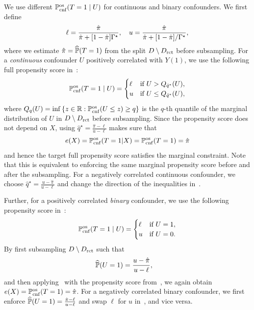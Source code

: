 We use different $\mathbb{P}_{\operatorname{cnf}}^{\operatorname{os}}(T = 1\mid U)$ for continuous and binary confounders.
We first define
\begin{equation}
\label{eq:uplow}
\ell = \frac{\hat{\pi}}{\hat{\pi} + [1-\hat{\pi}]\Gamma^{\star}}, \quad
u = \frac{\hat{\pi}}{\hat{\pi} + [1-\hat{\pi}]/\Gamma^{\star}},
\end{equation}
where we estimate $\hat{\pi} = \widehat{\mathbb{P}}(T = 1)$ from the split $D \setminus D_{\operatorname{rct}}$ before subsampling.
For a \emph{continuous} confounder $U$ positively correlated with $Y(1)$, we use the following full propensity score in~:
\begin{equation}
\label{adv_semi}
\mathbb{P}_{\operatorname{cnf}}^{\operatorname{os}}(T=1 \mid U) = 
\begin{cases}
    \ell & \text{if } U > Q_{\hat{q}^*}(U), \\
    u & \text{if } U \leq Q_{\hat{q}^*}(U),
\end{cases}
\end{equation}
where $Q_q(U) = \inf \left\{ z \in \mathbb{R} : {\mathbb{P}_{\operatorname{cnf}}^{\operatorname{os}}(U \leq z)} \geq q \right\}$ is the $q$-th quantile of the marginal distribution of $U$ in $D \setminus D_{\operatorname{rct}}$ before subsampling.
Since the propensity score does not depend on $X$, using $\hat{q}^\star = \frac{\hat{\pi} - \ell}{u - \ell}$ makes sure that 
$$e(X)=\mathbb{P}_{\operatorname{cnf}}^{\operatorname{os}}(T = 1|X)=\mathbb{P}_{\operatorname{cnf}}^{\operatorname{os}}(T = 1) = \hat \pi$$
and hence the target full propensity score satisfies the marginal constraint. 
Note that this is equivalent to enforcing the same marginal propensity score before and after the subsampling. 
For a negatively correlated continuous confounder, we choose $\hat{q}^\star = \frac{u - \hat{\pi}}{u - \ell}$ and change the direction of the inequalities in~.

Further, for a positively correlated \emph{binary} confounder, we use the following propensity score in~:
\begin{equation}
\label{adv_semi_binary}
\mathbb{P}_{\operatorname{cnf}}^{\operatorname{os}}(T=1 \mid U) = 
\begin{cases}
    \ell & \text{if } U = 1, \\
    u & \text{if } U = 0.
\end{cases}
\end{equation}
By first subsampling $D \setminus D_{\operatorname{rct}}$ such that
\begin{align*}
\widehat{\mathbb{P}}(U = 1) &= \frac{u - \hat{\pi}}{u - \ell},
\end{align*}
and then applying~ with the propensity score from~, we again obtain $e(X)=\mathbb{P}_{\operatorname{cnf}}^{\operatorname{os}}(T = 1) = \hat \pi$.
For a negatively correlated binary confounder, we first enforce
$\widehat{\mathbb{P}}(U = 1) = \frac{\hat{\pi} - \ell}{u - \ell}$ and swap $\ell$ for $u$ in~, and vice versa.

